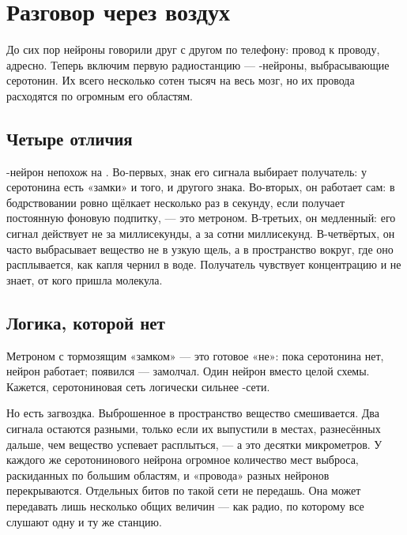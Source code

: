 \chapter{Разговор через воздух}


До сих пор нейроны говорили друг с другом по телефону: провод к проводу, адресно. Теперь включим первую радиостанцию --- -нейроны, выбрасывающие серотонин. Их всего несколько сотен тысяч на весь мозг, но их провода расходятся по огромным его областям.

\section*{Четыре отличия}

-нейрон непохож на . Во-первых, знак его сигнала выбирает получатель: у серотонина есть «замки» и того, и другого знака. Во-вторых, он работает сам: в бодрствовании ровно щёлкает несколько раз в секунду, если получает постоянную фоновую подпитку, --- это метроном. В-третьих, он медленный: его сигнал действует не за миллисекунды, а за сотни миллисекунд. В-четвёртых, он часто выбрасывает вещество не в узкую щель, а в пространство вокруг, где оно расплывается, как капля чернил в воде. Получатель чувствует концентрацию и не знает, от кого пришла молекула.

\section*{Логика, которой нет}

Метроном с тормозящим «замком» --- это готовое «не»: пока серотонина нет, нейрон работает; появился --- замолчал. Один нейрон вместо целой схемы. Кажется, серотониновая сеть логически сильнее -сети.

Но есть загвоздка. Выброшенное в пространство вещество смешивается. Два сигнала остаются разными, только если их выпустили в местах, разнесённых дальше, чем вещество успевает расплыться, --- а это десятки микрометров. У каждого же серотонинового нейрона огромное количество мест выброса, раскиданных по большим областям, и «провода» разных нейронов перекрываются. Отдельных битов по такой сети не передашь. Она может передавать лишь несколько общих величин --- как радио, по которому все слушают одну и ту же станцию.

